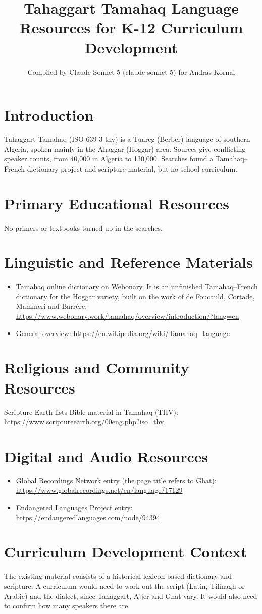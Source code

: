 \documentclass[12pt]{article}
\title{Tahaggart Tamahaq Language Resources for K-12 Curriculum Development}
\author{Compiled by Claude Sonnet 5 (claude-sonnet-5) for Andr\'as Kornai}
\date{}
\begin{document}
\maketitle

\section{Introduction}
Tahaggart Tamahaq (ISO 639-3 thv) is a Tuareg (Berber) language of southern Algeria, spoken mainly in the Ahaggar (Hoggar) area. Sources give conflicting speaker counts, from 40,000 in Algeria to 130,000. Searches found a Tamahaq--French dictionary project and scripture material, but no school curriculum.

\section{Primary Educational Resources}
No primers or textbooks turned up in the searches.

\section{Linguistic and Reference Materials}
\begin{itemize}
\item Tamahaq online dictionary on Webonary. It is an unfinished Tamahaq--French dictionary for the Hoggar variety, built on the work of de Foucauld, Cortade, Mammeri and Barr\`ere: \url{https://www.webonary.work/tamahaq/overview/introduction/?lang=en}
\item General overview: \url{https://en.wikipedia.org/wiki/Tamahaq_language}
\end{itemize}

\section{Religious and Community Resources}
Scripture Earth lists Bible material in Tamahaq (THV): \url{https://www.scriptureearth.org/00eng.php?iso=thv}

\section{Digital and Audio Resources}
\begin{itemize}
\item Global Recordings Network entry (the page title refers to Ghat): \url{https://www.globalrecordings.net/en/language/17129}
\item Endangered Languages Project entry: \url{https://endangeredlanguages.com/node/94394}
\end{itemize}

\section{Curriculum Development Context}
The existing material consists of a historical-lexicon-based dictionary and scripture. A curriculum would need to work out the script (Latin, Tifinagh or Arabic) and the dialect, since Tahaggart, Ajjer and Ghat vary. It would also need to confirm how many speakers there are.
\end{document}
